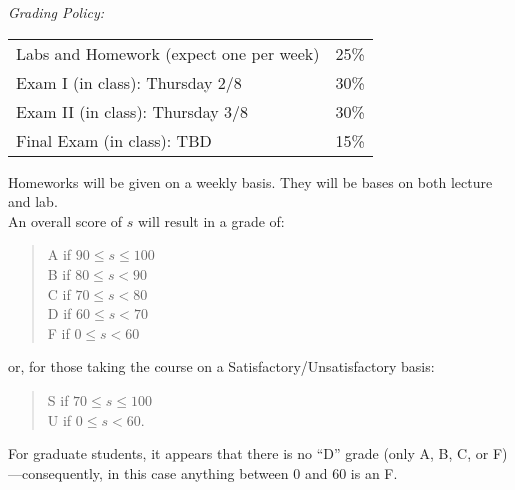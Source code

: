 \documentclass[11pt]{article}
\begin{document}



\emph{Grading Policy:} 
\begin{table}[htdp]
\begin{tabular}{ll}


Labs and Homework (expect one per week) & 25\%\\
Exam I  (in class):  Thursday 2/8 & 30\%\\
Exam II  (in class): Thursday 3/8 & 30\%\\
Final Exam (in class): TBD & 15\%\\
\end{tabular}
\label{default}
\end{table}%

Homeworks will be given on a weekly basis. They will be bases on both lecture and lab. \\

An overall score of $s$ will result in a grade of:
\begin{quote}
A if $90\leq s\leq 100$ \\
B if $80\leq s < 90$ \\
C if $70\leq s < 80$ \\
D if $60\leq s < 70$ \\
F if $0\leq s < 60$
\end{quote}
or, for those taking the course on a Satisfactory/Unsatisfactory basis:
\begin{quote}
S if $70\leq s\leq 100$ \\
U if $0\leq s < 60$.
\end{quote}
For graduate students, it appears that there is no ``D'' grade (only A, B, C, or F)---consequently, in this case anything between $0$ and $60$ is an F. \\
\end{document}
